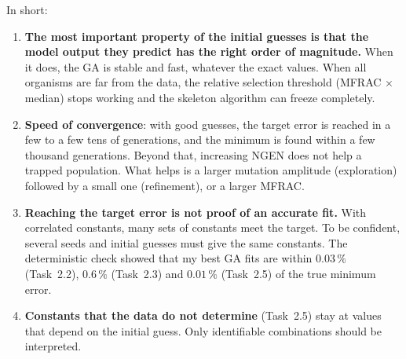 In short:
\begin{enumerate}
  \item \textbf{The most important property of the initial guesses is that the model output they
        predict has the right order of magnitude.} When it does, the GA is stable and fast, whatever the
        exact values. When all organisms are far from the data, the relative selection threshold
        (MFRAC$\,\times\,$median) stops working and the skeleton algorithm can freeze completely.
  \item \textbf{Speed of convergence}: with good guesses, the target error is reached in a few to a few
        tens of generations, and the minimum is found within a few thousand generations. Beyond that,
        increasing NGEN does not help a trapped population. What helps is a larger mutation amplitude
        (exploration) followed by a small one (refinement), or a larger MFRAC.
  \item \textbf{Reaching the target error is not proof of an accurate fit.} With correlated constants,
        many sets of constants meet the target. To be confident, several seeds and initial guesses must give
        the same constants. The deterministic check showed that my best GA fits are within
        $0.03\,\%$ (Task~2.2), $0.6\,\%$ (Task~2.3) and $0.01\,\%$ (Task~2.5) of the true minimum error.
  \item \textbf{Constants that the data do not determine} (Task~2.5) stay at values that depend on the
        initial guess. Only identifiable combinations should be interpreted.
\end{enumerate}

